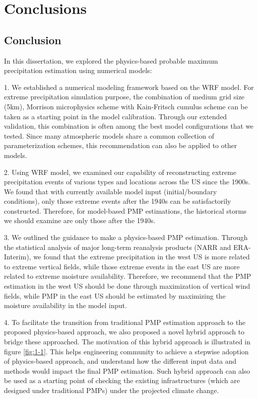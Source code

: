 \chapter {Conclusions}
\label{ch:con}

\section {Conclusion}

In this dissertation, we explored the physics-based probable maximum precipitation estimation using numerical models:

1. We established a numerical modeling framework based on the WRF model. For extreme precipitation simulation purpose, the combination of medium grid size (5km), Morrison microphysics scheme with Kain-Fritsch cumulus scheme can be taken as a starting point in the model calibration. Through our extended validation, this combination is often among the best model configurations that we tested. Since many atmospheric models share a common collection of parameterization schemes, this recommendation can also be applied to other models.

2. Using WRF model, we examined our capability of reconstructing extreme precipitation events of various types and locations across the US since the 1900s. We found that with currently available model input (initial/boundary conditions), only those extreme events after the 1940s can be satisfactorily constructed. Therefore, for model-based PMP estimations, the historical storms we should examine are only those after the 1940s.

3. We outlined the guidance to make a physics-based PMP estimation. Through the statistical analysis of major long-term reanalysis products (NARR and ERA-Interim), we found that the extreme precipitation in the west US is more related to extreme vertical fields, while those extreme events in the east US are more related to extreme moisture availability. Therefore, we recommend that the PMP estimation in the west US should be done through maximization of vertical wind fields, while PMP in the east US should be estimated by maximizing the moisture availability in the model input.

4. To facilitate the transition from traditional PMP estimation approach to the proposed physics-based approach, we also proposed a novel hybrid approach to bridge these approached. The motivation of this hybrid approach is illustrated in figure \ref{fig:1-1}. This helps engineering community to achieve a stepwise adoption of physics-based approach, and understand how the different input data and methods would impact the final PMP estimation. Such hybrid approach can also be used as a starting point of checking the existing infrastructures (which are designed under traditional PMPs) under the projected climate change.


